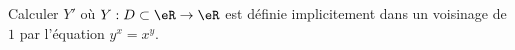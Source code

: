 
\begin{exercice}\label{exoImplicite0002}

Calculer $Y'$ où $Y: D \subset \eR \rightarrow \eR$ est définie implicitement dans un voisinage de $1$ par l'équation $y^x = x^y$.

\end{exercice}
